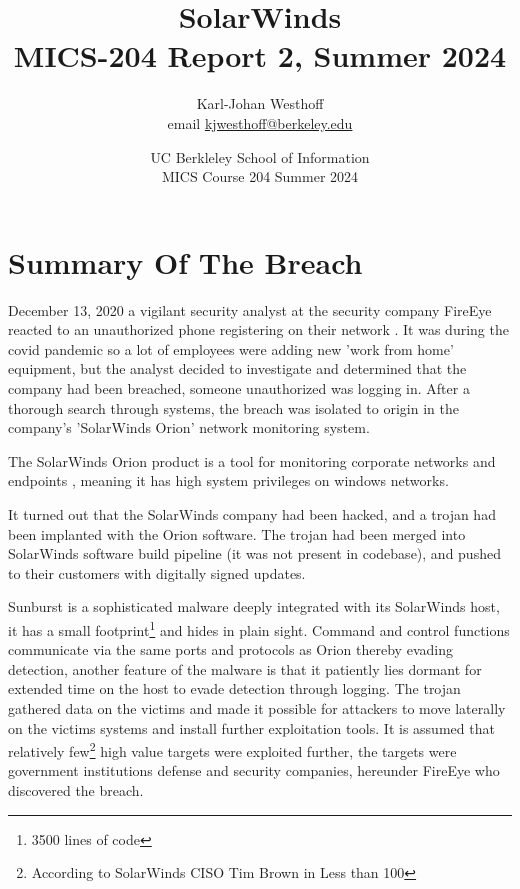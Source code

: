 \documentclass[
	letterpaper, %
	10pt, %
	unnumberedsections, %
	twoside, %
]{LTJournalArticle}
\title{SolarWinds \\ MICS-204 Report 2, Summer 2024} %
\author{
	Karl-Johan Westhoff \\
	email \href{mailto:kjwesthoff@berkeley.edu}{kjwesthoff@berkeley.edu}
}
\date{UC Berkleley School of Information \\
MICS Course 204 Summer 2024
}
\begin{document}
\maketitle %


\section{Summary Of The Breach}
December 13, 2020 a vigilant security analyst at the security company FireEye reacted to an unauthorized phone registering on their network \cite{CNN_FireEye}. It was during the covid pandemic so a lot of employees were adding new 'work from home' equipment, but the analyst decided to investigate and determined that the company had been breached, someone unauthorized was logging in. After a thorough search through systems, the breach was isolated to origin in the company's 'SolarWinds Orion' network monitoring system.\par The SolarWinds Orion product is a tool for monitoring corporate networks and endpoints \cite{SolarWindsOrion}, meaning it has high system privileges on windows networks. \par
It turned out that the SolarWinds company had been hacked, and a trojan had been implanted with the Orion software. The trojan had been merged into SolarWinds software build pipeline (it was not present in codebase), and pushed to their customers with digitally signed updates. \par
Sunburst is a sophisticated malware deeply integrated with its SolarWinds host, it has a small footprint\footnote{3500 lines of code} and hides in plain sight. Command and control functions communicate via the same ports and protocols as Orion thereby evading detection, another feature of the malware is that it patiently lies dormant for extended time on the host to evade detection through logging. The trojan gathered data on the victims and made it possible for attackers to move laterally on the victims systems and install further exploitation tools. It is assumed that relatively few\footnote{According to SolarWinds CISO Tim Brown in \cite{SolarWindsCISO} Less than 100} high value targets were exploited further, the targets were government institutions defense and security companies, hereunder FireEye who discovered the breach.
\end{document}
